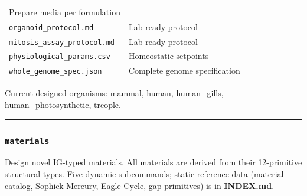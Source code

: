 \begin{longtable}[]{@{}ll@{}}
\begin{minipage}[t]{0.54\columnwidth}
Prepare media per formulation\strut
\end{minipage}\tabularnewline
\begin{minipage}[t]{0.40\columnwidth}\raggedright
\texttt{organoid\_protocol.md}\strut
\end{minipage} & \begin{minipage}[t]{0.54\columnwidth}\raggedright
Lab-ready protocol\strut
\end{minipage}\tabularnewline
\begin{minipage}[t]{0.40\columnwidth}\raggedright
\texttt{mitosis\_assay\_protocol.md}\strut
\end{minipage} & \begin{minipage}[t]{0.54\columnwidth}\raggedright
Lab-ready protocol\strut
\end{minipage}\tabularnewline
\begin{minipage}[t]{0.40\columnwidth}\raggedright
\texttt{physiological\_params.csv}\strut
\end{minipage} & \begin{minipage}[t]{0.54\columnwidth}\raggedright
Homeostatic setpoints\strut
\end{minipage}\tabularnewline
\begin{minipage}[t]{0.40\columnwidth}\raggedright
\texttt{whole\_genome\_spec.json}\strut
\end{minipage} & \begin{minipage}[t]{0.54\columnwidth}\raggedright
Complete genome specification\strut
\end{minipage}\tabularnewline
\bottomrule
\end{longtable}

Current designed organisms: mammal, human, human\_gills,
human\_photosynthetic, treople.

\begin{center}\rule{0.5\linewidth}{0.5pt}\end{center}

\hypertarget{materials}{%
\subsubsection{\texorpdfstring{\texttt{materials}}{materials}}\label{materials}}

Design novel IG-typed materials. All materials are derived from their
12-primitive structural types. Five dynamic subcommands; static
reference data (material catalog, Sophick Mercury, Eagle Cycle, gap
primitives) is in \textbf{INDEX.md}.

